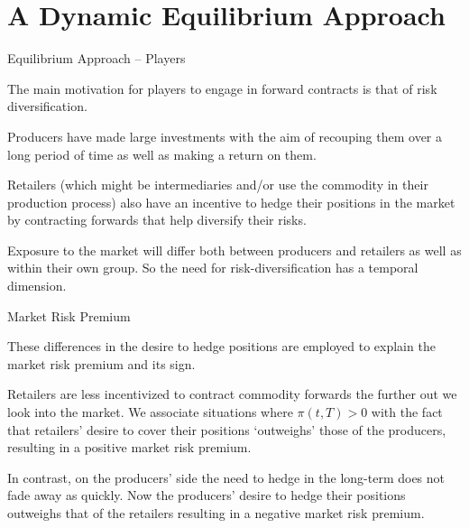 \section{A Dynamic Equilibrium Approach}

{Equilibrium Approach -- Players}







	
The main
motivation for players to engage in forward contracts is that of
risk diversification.


	
Producers have made large investments with the
aim of recouping them over a long period of time as well as making a
return on them.


	
Retailers (which might be intermediaries and/or use the commodity in
their production process) also have an incentive to hedge their
positions in the market by contracting forwards that help diversify
their risks.


	
Exposure to the market will differ both between producers and
retailers as well as within their own group.
So the need for risk-diversification has a temporal dimension.





{Market Risk Premium}







	These differences in the
desire to hedge positions are employed to explain the market risk premium and
its sign.


	Retailers are less incentivized to contract commodity forwards
the further out we look into the market. We associate situations where
$\pi(t,T)>0$ with the fact that retailers' desire to cover their
positions `outweighs' those of the producers, resulting in a
positive market risk premium.


	In contrast, on the producers' side the need to hedge in the long-term
does not fade away as quickly. Now the producers' desire to hedge their positions outweighs that of the retailers resulting in a negative market risk premium.





